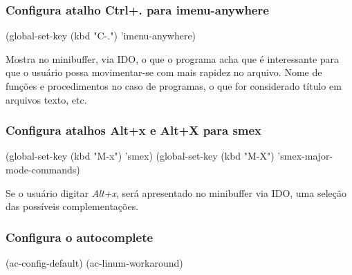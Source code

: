 \documentclass[]{article}
\newenvironment{Shaded}{}{}
\newcommand{\StringTok}[1]{\textcolor[rgb]{0.25,0.44,0.63}{{#1}}}
\newcommand{\NormalTok}[1]{{#1}}
\begin{document}
\subsubsection{\texorpdfstring{Configura atalho \textbf{Ctrl+.} para
imenu-anywhere}{Configura atalho Ctrl+. para imenu-anywhere}}\label{configura-atalho-ctrl.-para-imenu-anywhere}

\begin{Shaded}
\begin{Highlighting}[]
\NormalTok{(global-set-key (kbd }\StringTok{"C-."}\NormalTok{) 'imenu-anywhere)}
\end{Highlighting}
\end{Shaded}

Mostra no minibuffer, via IDO, o que o programa acha que é interessante
para que o usuário possa movimentar-se com mais rapidez no arquivo. Nome
de funções e procedimentos no caso de programas, o que for considerado
título em arquivos texto, etc.

\subsubsection{\texorpdfstring{Configura atalhos \textbf{Alt+x} e
\textbf{Alt+X} para
smex}{Configura atalhos Alt+x e Alt+X para smex}}\label{configura-atalhos-altx-e-altx-para-smex}

\begin{Shaded}
\begin{Highlighting}[]
\NormalTok{(global-set-key (kbd }\StringTok{"M-x"}\NormalTok{) 'smex)}
\NormalTok{(global-set-key (kbd }\StringTok{"M-X"}\NormalTok{) 'smex-major-mode-commands)}
\end{Highlighting}
\end{Shaded}

Se o usuário digitar \emph{Alt+x}, será apresentado no minibuffer via
IDO, uma seleção das possíveis complementações.

\subsubsection{Configura o autocomplete}\label{configura-o-autocomplete}

\begin{Shaded}
\begin{Highlighting}[]
\NormalTok{(ac-config-default)}
\NormalTok{(ac-linum-workaround)}
\end{Highlighting}
\end{Shaded}
\end{document}
